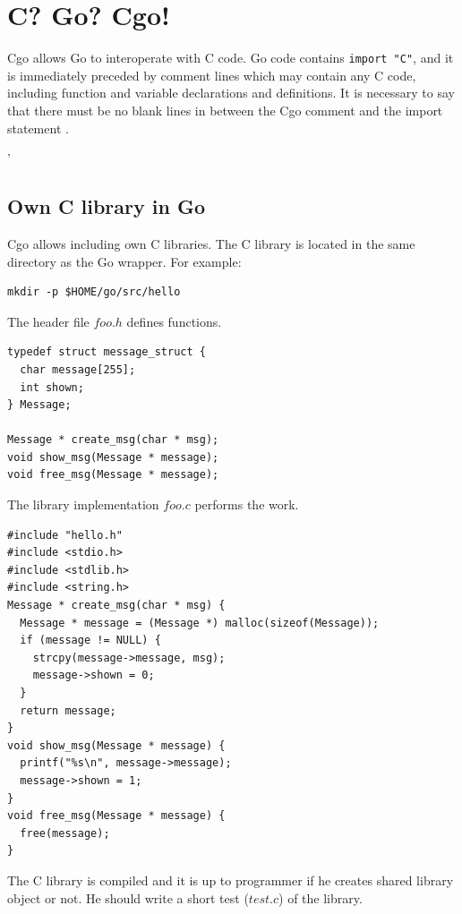 \documentclass[
  oneside, 12pt, 
  printed, %
  notable,   %
  nolof,     %
  nolot,     %
]{fithesis3}
\begin{document}
\section{C? Go? Cgo!}\label{cgo}
Cgo allows Go to interoperate with C code. Go code contains \texttt{import "C"}, and it is immediately preceded by comment lines which may contain any C code, including function and variable declarations and definitions. It is necessary to say that there must be no blank lines in 
between the Cgo comment and the import statement \cite{cgo-command}. 

'

\subsection{Own C library in Go}

Cgo allows including own C libraries. The C library is located in the same directory as the Go wrapper. For example:
\begin{lstlisting}
mkdir -p $HOME/go/src/hello
\end{lstlisting}
The header file $foo.h$ defines functions.
\begin{lstlisting}
typedef struct message_struct {
  char message[255];
  int shown;
} Message;

Message * create_msg(char * msg);
void show_msg(Message * message);
void free_msg(Message * message);
\end{lstlisting}
The library implementation $foo.c$ performs the work.
\begin{lstlisting}
#include "hello.h"
#include <stdio.h>
#include <stdlib.h>
#include <string.h>
Message * create_msg(char * msg) {
  Message * message = (Message *) malloc(sizeof(Message));
  if (message != NULL) {
    strcpy(message->message, msg);
    message->shown = 0;
  }
  return message;
}
void show_msg(Message * message) {
  printf("%s\n", message->message);
  message->shown = 1;
} 
void free_msg(Message * message) {
  free(message);
}
\end{lstlisting}
The C library is compiled and it is up to programmer if he creates shared library object or not. He should write a short test ($test.c$) of the library.
\end{document}
